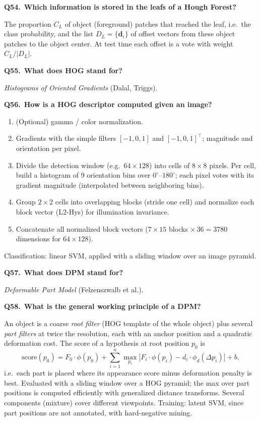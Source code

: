 \documentclass[11pt,a4paper]{article}
\newcommand{\keep}[1]{\par
  \ifdim\dimexpr\pagegoal-\pagetotal\relax<#1\relax\newpage\fi}
\newcommand{\q}[2]{\keep{2.5cm}\medskip
  {\sffamily\bfseries\color{questc}Q#1.}\ {\sffamily\bfseries #2}\par}
\begin{document}
\q{54}{Which information is stored in the leafs of a Hough Forest?}
The proportion $C_L$ of object (foreground) patches that reached the leaf,
i.e.\ the class probability, and the list $D_L = \{\mathbf{d}_i\}$ of offset
vectors from these object patches to the object center. At test time each
offset is a vote with weight $C_L/|D_L|$.

\q{55}{What does HOG stand for?}
\emph{Histograms of Oriented Gradients} (Dalal, Triggs).

\q{56}{How is a HOG descriptor computed given an image?}
\begin{enumerate}
  \item (Optional) gamma / color normalization.
  \item Gradients with the simple filters $[-1,0,1]$ and $[-1,0,1]^\top$;
    magnitude and orientation per pixel.
  \item Divide the detection window (e.g.\ $64\times128$) into cells of
    $8\times8$ pixels. Per cell, build a histogram of 9 orientation bins over
    $0^\circ$--$180^\circ$; each pixel votes with its gradient magnitude
    (interpolated between neighboring bins).
  \item Group $2\times2$ cells into overlapping blocks (stride one cell) and
    normalize each block vector (L2-Hys) for illumination invariance.
  \item Concatenate all normalized block vectors ($7\times15$ blocks
    $\times\,36 = 3780$ dimensions for $64\times128$).
\end{enumerate}
\noindent
Classification: linear SVM, applied with a sliding window over an image
pyramid.

\q{57}{What does DPM stand for?}
\emph{Deformable Part Model} (Felzenszwalb et al.).

\q{58}{What is the general working principle of a DPM?}
An object is a coarse \emph{root filter} (HOG template of the whole object)
plus several \emph{part filters} at twice the resolution, each with an anchor
position and a quadratic deformation cost. The score of a hypothesis at root
position $p_0$ is
\[
  \text{score}(p_0) = F_0\cdot\phi(p_0)
  + \sum_{i=1}^{n}\max_{p_i}\big[F_i\cdot\phi(p_i) - d_i\cdot\phi_d(\Delta p_i)\big]
  + b ,
\]
\noindent
i.e.\ each part is placed where its appearance score minus deformation penalty
is best. Evaluated with a sliding window over a HOG pyramid; the max over part
positions is computed efficiently with generalized distance transforms. Several
components (mixture) cover different viewpoints. Training: latent SVM, since
part positions are not annotated, with hard-negative mining.
\end{document}
